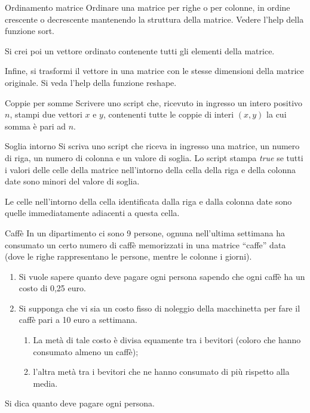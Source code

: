 \documentclass[aspectratio=169, handout]{beamer}
\begin{document}
\begin{frame}{Ordinamento matrice}
Ordinare una matrice per righe o per colonne, in ordine crescente o decrescente mantenendo la struttura della matrice. Vedere l'help della funzione sort.

Si crei poi un vettore ordinato contenente tutti gli elementi della matrice.

Infine, si trasformi il vettore in una matrice con le stesse dimensioni della matrice originale. Si veda l'help della funzione reshape.
\end{frame}


\begin{frame}{Coppie per somme}
Scrivere uno script che, ricevuto in ingresso un intero positivo $n$, stampi due vettori $x$ e $y$, contenenti tutte le coppie di interi $(x,y)$ la cui somma è pari ad $n$.
\end{frame}

\begin{frame}{Soglia intorno}
Si scriva uno script che riceva in ingresso una matrice, un numero di riga, un numero di colonna e un valore di soglia.
    Lo script stampa \emph{true} se tutti i valori delle celle della matrice nell'intorno della cella della riga e della colonna date sono minori del valore di soglia.

Le celle nell'intorno della cella identificata dalla riga e dalla colonna date sono quelle immediatamente adiacenti a questa cella.
\end{frame}

\begin{frame}{Caffè}
In un dipartimento ci sono 9 persone, ognuna nell'ultima settimana ha
consumato un certo numero di caffè memorizzati in una matrice ``caffe'' data
(dove le righe rappresentano le persone, mentre le colonne i giorni).
\begin{enumerate}
	\item Si vuole sapere quanto deve pagare ogni persona sapendo che ogni caffè
	ha un costo di 0,25 euro.
	\item Si supponga che vi sia un costo fisso di noleggio della macchinetta per
	fare il caffè pari a 10 euro a settimana.
	\begin{enumerate}
		\item  La metà di tale costo è divisa equamente tra i bevitori (coloro che
		hanno consumato almeno un caffè);
		\item l'altra metà tra i bevitori che ne hanno consumato di più rispetto
		alla media.
	\end{enumerate}
\end{enumerate}

Si dica quanto deve pagare ogni persona.
\end{frame}
\end{document}
